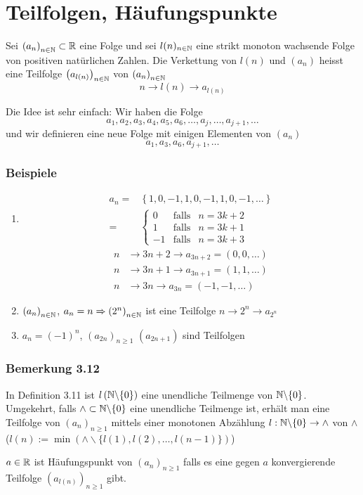 \section{Teilfolgen, Häufungspunkte}
\begin{definition}{3.11}
Sei $\left( a_n\right)_{n\in\mathbb{N}}\subset\mathbb{R}$ eine Folge und sei $l(n)_{n\in\mathbb{N}}$ eine strikt monoton wachsende Folge von positiven natürlichen Zahlen. Die Verkettung von $l(n)$ und $\left( a_n\right)$ heisst eine Teilfolge $\left( a_{l(n)}\right)_{n\in\mathbb{N}}$ von $\left( a_{n}\right)_{n\in\mathbb{N}}$
\[n\to l(n)\to a_{l(n)}\]
\end{definition}
Die Idee ist sehr einfach: Wir haben die Folge \[a_1,a_2,a_3,a_4,a_5,a_6,\dots,a_j,\dots,a_{j+1},\dots \]
und wir definieren eine neue Folge mit einigen Elementen von $\left( a_n\right)$
\[a_1,a_3,a_6,a_{j+1},\dots \]

\subsubsection*{Beispiele}
\begin{enumerate}
\item \begin{align*}
{a_n} =&\left\{ {1,0, - 1,1,0, - 1,1,0, - 1, \ldots } \right\}\\
 =&\left\{ {\begin{array}{*{20}{c}}
0&{{\text{falls}}}&{n = 3k + 2}\\
1&{{\text{falls}}}&{n = 3k + 1}\\
{ - 1}&{{\text{falls}}}&{n = 3k + 3}
\end{array}} \right.
\end{align*}
\begin{align*}
n&\to 3n + 2 \to {a_{3n + 2}} = \left( {0,0, \ldots } \right)\\
n&\to 3n + 1 \to {a_{3n + 1}} = \left( {1,1, \ldots } \right)\\
n&\to 3n \to {a_{3n}} = \left( { - 1, - 1, \ldots } \right)
\end{align*}
\item $\left( a_n\right)_{n\in\mathbb{N}}$, $a_n=n\Rightarrow \left( 2^n\right)_{n\in\mathbb{N}}$ ist eine Teilfolge $n\to 2^n\to a_{2^n}$
\item $a_n=\left( -1\right)^n$, $\left( a_{2n}\right)_{n\geq 1}$ $\left( a_{2n+1}\right)$ sind Teilfolgen
\end{enumerate}

\subsubsection*{Bemerkung 3.12}
In Definition 3.11 ist $l\left( \mathbb{N}\backslash\{ 0\}\right)$ eine unendliche Teilmenge von $\mathbb{N}\backslash\{ 0\}$. Umgekehrt, falls $\wedge\subset\mathbb{N}\backslash\{ 0\}$ eine unendliche Teilmenge ist, erhält man eine Teilfolge von $\left( a_n\right)_{n\geq 1}$ mittels einer monotonen Abzählung $l:\mathbb{N}\backslash\{ 0\}\to\wedge$ von $\wedge$ ($l(n):=\min\left( \wedge \backslash\{ l(1),l(2),\dots ,l(n-1)\}\right)$)
\begin{definition}{3.13}
$a\in\mathbb{R}$ ist Häufungspunkt von $\left( a_n\right)_{n\geq 1}$ falls es eine gegen $a$ konvergierende Teilfolge $\left( a_{l(n)}\right)_{n\geq 1}$ gibt.
\end{definition}
